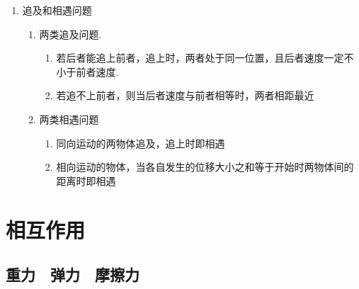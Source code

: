 \documentclass[cn,11pt]{elegantbook}
\begin{document}
\begin{enumerate}
\begin{enumerate}
\begin{enumerate}
         \end{enumerate}
      \end{enumerate}
      \item 追及和相遇问题
      \begin{enumerate}
         \item 两类追及问题.
         \begin{enumerate}
            \item 若后者能追上前者，追上时，两者处于同一位置，且后者速度一定不小于前者速度.
            \item 若追不上前者，则当后者速度与前者相等时，两者相距最近            
         \end{enumerate}
         \item 两类相遇问题
         \begin{enumerate}
            \item 同向运动的两物体追及，追上时即相遇
            \item 相向运动的物体，当各自发生的位移大小之和等于开始时两物体间的距离时即相遇
            
         \end{enumerate}
      \end{enumerate}
   \end{enumerate}


\chapter{相互作用}

   \section{重力　弹力　摩擦力}
\end{document}

